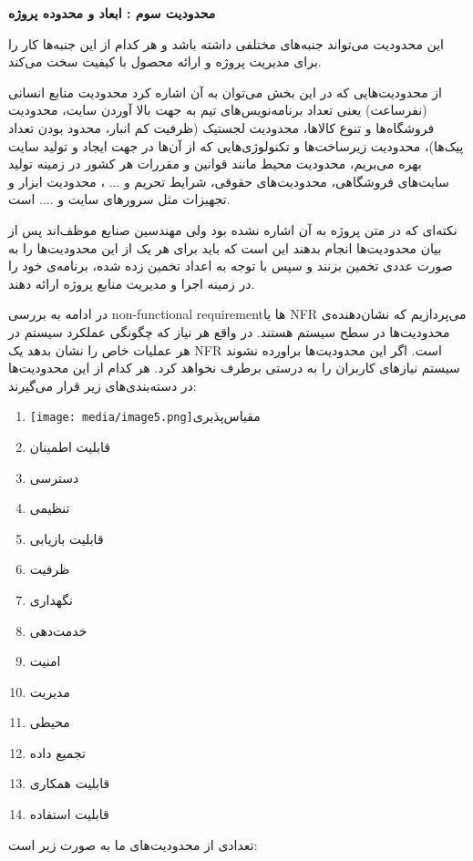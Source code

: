 \documentclass[]{article}
\begin{document}
\textbf{محدودیت سوم : ابعاد و محدوده پروژه}

این محدودیت می‌تواند جنبه‌های مختلفی داشته باشد و هر کدام از این جنبه‌ها
کار را برای مدیریت پروژه و ارائه محصول با کیفیت سخت می‌کند.

از محدودیت‌هایی که در این بخش می‌توان به آن اشاره کرد محدودیت منابع
انسانی (نفرساعت) یعنی تعداد برنامه‌نویس‌های تیم به جهت بالا آوردن سایت،
محدودیت فروشگاه‌ها و تنوع کالاها، محدودیت لجستیک (ظرفیت کم انبار، محدود
بودن تعداد پیک‌ها)، محدودیت زیرساخت‌ها و تکنولوژی‌هایی که از آن‌ها در
جهت ایجاد و تولید سایت بهره می‌بریم، محدودیت محیط مانند قوانین و مقررات
هر کشور در زمینه تولید سایت‌های فروشگاهی، محدودیت‌های حقوقی، شرایط تحریم
و ... ، محدودیت ابزار و تجهیزات مثل سرورهای سایت و .... است.

نکته‌ای که در متن پروژه به آن اشاره نشده بود ولی مهندسین صنایع موظف‌اند
پس از بیان محدودیت‌ها انجام بدهند این است که باید برای هر یک از این
محدودیت‌ها را به صورت عددی تخمین بزنند و سپس با توجه به اعداد تخمین زده
شده، برنامه‌ی خود را در زمینه اجرا و مدیریت منابع پروژه ارائه دهند.

در ادامه به بررسی non-functional requirementها یا NFR می‌پردازیم که
نشان‌دهنده‌ی محدودیت‌ها در سطح سیستم هستند. در واقع هر نیاز که چگونگی
عملکرد سیستم در هر عملیات خاص را نشان بدهد یک NFR است. اگر این
محدودیت‌ها براورده نشوند سیستم نیازهای کاربران را به درستی برطرف نخواهد
کرد. هر کدام از این محدودیت‌ها در دسته‌بندی‌های زیر قرار می‌گیرند:

\begin{enumerate}
\def\labelenumi{\arabic{enumi}.}
\item
  \texttt{[image: media/image5.png]}مقیاس‌پذیری
\item
  قابلیت اطمینان
\item
  دسترسی
\item
  تنظیمی
\item
  قابلیت بازیابی
\item
  ظرفیت
\item
  نگهداری
\item
  خدمت‌دهی
\item
  امنیت
\item
  مدیریت
\item
  محیطی
\item
  تجمیع داده
\item
  قابلیت همکاری
\item
  قابلیت استفاده
\end{enumerate}

تعدادی از محدودیت‌های ما به صورت زیر است:
\end{document}
